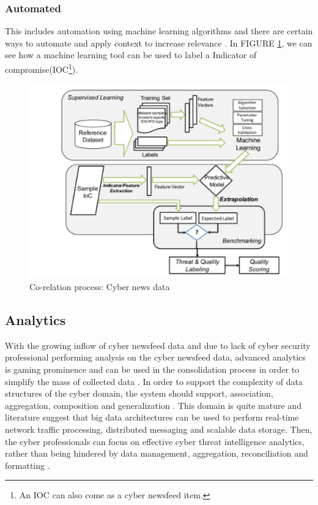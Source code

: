 \subsubsection{Automated}
 This includes automation using machine learning algorithms and there are certain ways to automate and apply context to increase relevance \citep{wagner2017relevance}. In FIGURE \ref{fig:co-relation}, 
 we can see how a machine learning tool can be used to label a Indicator of compromise(IOC\footnote{An IOC can also come as a cyber newsfeed item.
 }). 
\begin{figure}[ht]
    \centering
    \includegraphics[width=1\linewidth]{Figures/co-relation}
    \caption{Co-relation process: Cyber news data}
    \label{fig:co-relation}
\end{figure}


\subsection{Analytics}
With the growing inflow of cyber newsfeed data 
and due to lack of cyber security professional performing analysis 
on the cyber newsfeed data, 
advanced analytics is gaming prominence 
and can be used in the consolidation process in order to simplify the mass of collected data \citep{dull2015cyberthreat}. 
In order to support the complexity of data structures 
of the cyber domain, 
the system should support, association, aggregation, composition and generalization \citep{brown2015cyber}. 
This domain is quite mature and literature suggest that 
big data architectures 
can be used to perform real-time network traffic processing, distributed messaging and scalable data storage. 
Then, the cyber professionals can focus on effective cyber threat intelligence analytics, 
rather than being hindered by data management, aggregation, reconciliation and formatting \citep{wheelus2016towards}. 

